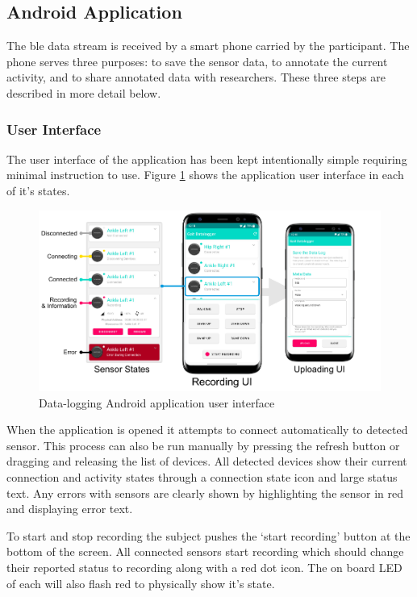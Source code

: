 \subsection{Android Application}
The \acrshort{ble} data stream is received by a smart phone carried by the participant. The phone serves three purposes: to save the sensor data, to annotate the current activity, and to share annotated data with researchers. These three steps are described in more detail below. 

\subsubsection{User Interface}
The user interface of the application has been kept intentionally simple requiring minimal instruction to use. Figure \ref{fig:methods-app-user-interface} shows the application user interface in each of it's states.

\begin{figure}[hbt]
    \centering
    \includegraphics[width=\textwidth]{content/3-Methods/User_Interface.pdf}
    \caption{Data-logging Android application user interface}
    \label{fig:methods-app-user-interface}
\end{figure}

When the application is opened it attempts to connect automatically to detected sensor. This process can also be run manually by pressing the refresh button or dragging and releasing the list of devices. All detected devices show their current connection and activity states through a connection state icon and large status text. Any errors with sensors are clearly shown by highlighting the sensor in red and displaying error text.

To start and stop recording the subject pushes the `start recording' button at the bottom of the screen. All connected sensors start recording which should change their reported status to recording along with a red dot icon. The on board LED of each will also flash red to physically show it's state.

